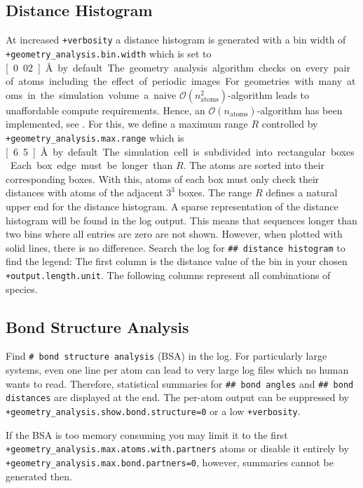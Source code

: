 \documentclass[oribibl]{llncs}
\newcommand{\um}[1]{_{\mathrm{#1}}}
\newcommand{\ttt}[1]{\texttt{#1}}
\begin{document}
\subsection{Distance Histogram} \label{sec:distance-histogram}
%
At increased \ttt{+verbosity} a distance histogram is generated with
a bin width of \ttt{+geometry\_analysis.bin.width} which is set to \unit[0.02]{\AA} by default.
The geometry analysis algorithm checks on every pair of atoms
including the effect of periodic images.
For geometries with many atoms in the simulation volume
a naive $\mathcal O(n\um{atoms}^2)$-algorithm 
leads to unaffordable compute requirements.
Hence, an $\mathcal O(n\um{atoms})$-algorithm has been implemented, see \cite{a43theory}.
For this, we define a maximum range $R$ controlled 
by \ttt{+geometry\_analysis.max.range} which is \unit[6.5]{\AA} by default.
The simulation cell is subdivided into rectangular boxes. 
Each box edge must be longer than $R$. 
The atoms are sorted into their corresponding boxes.
With this, atoms of each box must only check their distances 
with atoms of the adjacent $3^3$ boxes.
The range $R$ defines a natural upper end for the distance histogram.
A sparse representation of the distance histogram will be found in the log output.
This means that sequences longer than two bins where all entries are zero are not shown.
However, when plotted with solid lines, there is no difference.
Search the log for \ttt{\#\# distance histogram} to find the legend:
The first column is the distance value of the bin in your chosen \ttt{+output.length.unit}.
The following columns represent all combinations of species.

\subsection{Bond Structure Analysis} \label{sec:bond-structure-analysis}
%
Find \ttt{\# bond structure analysis} (BSA) in the log.
For particularly large systems, even one line per atom
can lead to very large log files which no human wants to read.
Therefore, statistical summaries 
for \ttt{\#\# bond angles} 
and \ttt{\#\# bond distances} are displayed at the end.
The per-atom output can be suppressed
by \ttt{+geometry\_analysis.show.bond.structure=0} or a low \ttt{+verbosity}.

\noindent
If the BSA is too memory consuming you may limit it to the first\\
\ttt{+geometry\_analysis.max.atoms.with.partners} atoms 
or disable it entirely by \ttt{+geometry\_analysis.max.bond.partners=0},
however, summaries cannot be generated then.
\end{document}
